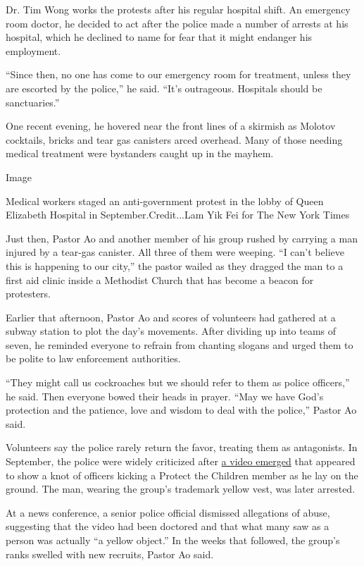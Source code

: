 Dr. Tim Wong works the protests after his regular hospital shift. An
emergency room doctor, he decided to act after the police made a number
of arrests at his hospital, which he declined to name for fear that it
might endanger his employment.

``Since then, no one has come to our emergency room for treatment,
unless they are escorted by the police,'' he said. ``It's outrageous.
Hospitals should be sanctuaries.''

One recent evening, he hovered near the front lines of a skirmish as
Molotov cocktails, bricks and tear gas canisters arced overhead. Many of
those needing medical treatment were bystanders caught up in the mayhem.

Image

Medical workers staged an anti-government protest in the lobby of Queen
Elizabeth Hospital in September.Credit...Lam Yik Fei for The New York
Times

Just then, Pastor Ao and another member of his group rushed by carrying
a man injured by a tear-gas canister. All three of them were weeping.
``I can't believe this is happening to our city,'' the pastor wailed as
they dragged the man to a first aid clinic inside a Methodist Church
that has become a beacon for protesters.

Earlier that afternoon, Pastor Ao and scores of volunteers had gathered
at a subway station to plot the day's movements. After dividing up into
teams of seven, he reminded everyone to refrain from chanting slogans
and urged them to be polite to law enforcement authorities.

``They might call us cockroaches but we should refer to them as police
officers,'' he said. Then everyone bowed their heads in prayer. ``May we
have God's protection and the patience, love and wisdom to deal with the
police,'' Pastor Ao said.

Volunteers say the police rarely return the favor, treating them as
antagonists. In September, the police were widely criticized after
\href{https://www.nytimes3xbfgragh.onion/2019/09/24/world/asia/hong-kong-yellow-object.html}{a
video emerged} that appeared to show a knot of officers kicking a
Protect the Children member as he lay on the ground. The man, wearing
the group's trademark yellow vest, was later arrested.

At a news conference, a senior police official dismissed allegations of
abuse, suggesting that the video had been doctored and that what many
saw as a person was actually ``a yellow object.'' In the weeks that
followed, the group's ranks swelled with new recruits, Pastor Ao said.

